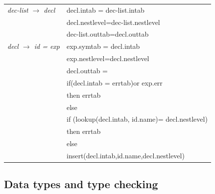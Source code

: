 \documentclass[11pt]{article}
\begin{document}
\begin{center}
\begin{tabular}{ll}
\hline
\emph{dec-list \(\to\) decl} & decl.intab = dec-list.intab\\
 & decl.nestlevel=dec-list.nestlevel\\
 & dec-list.outtab=decl.outtab\\
\hline
\emph{decl \(\to\) id = exp} & exp.symtab = decl.intab\\
 & exp.nestlevel=decl.nestlevel\\
 & decl.outtab =\\
 & if(decl.intab = errtab)or exp.err\\
 & then errtab\\
 & else\\
 & if (lookup(decl.intab, id.name)= decl.nestlevel)\\
 & then errtab\\
 & else\\
 & insert(decl.intab,id.name,decl.nestlevel)\\
\end{tabular}
\end{center}
\rmfamily


\subsection{Data types and type checking}
\label{sec:orga57d00a}
\end{document}
